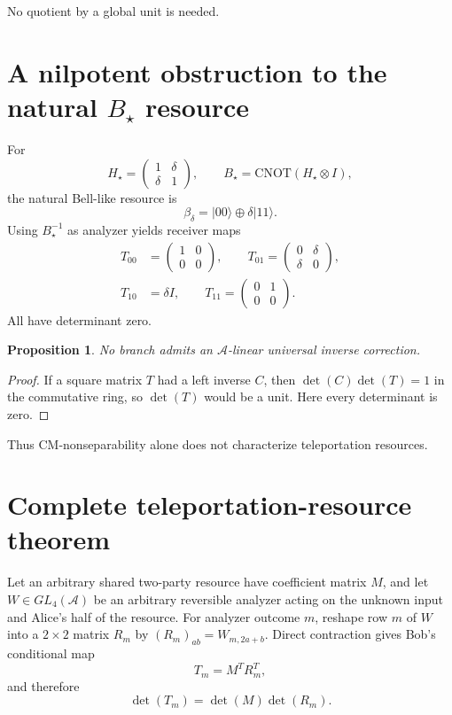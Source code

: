 \documentclass[11pt]{article}
\newtheorem{proposition}{Proposition}
\newcommand{\A}{\mathcal A}
\newcommand{\xorp}{\mathbin{\oplus}}
\newcommand{\ket}[1]{\lvert #1\rangle}
\begin{document}
No quotient by a global unit is needed.

\section{A nilpotent obstruction to the natural $B_\star$ resource}

For
\[
H_\star=\begin{pmatrix}1&\delta\\\delta&1\end{pmatrix},\qquad
B_\star=\mathrm{CNOT}(H_\star\otimes I),
\]
the natural Bell-like resource is
\[
\beta_\delta=\ket{00}\xorp\delta\ket{11}.
\]
Using $B_\star^{-1}$ as analyzer yields receiver maps
\[
\begin{split}
T_{00}&=\begin{pmatrix}1&0\\0&0\end{pmatrix},\qquad
T_{01}=\begin{pmatrix}0&\delta\\\delta&0\end{pmatrix},\\
T_{10}&=\delta I,\qquad
T_{11}=\begin{pmatrix}0&1\\0&0\end{pmatrix}.
\end{split}
\]
All have determinant zero.

\begin{proposition}
No branch admits an $\A$-linear universal inverse correction.
\end{proposition}

\begin{proof}
If a square matrix $T$ had a left inverse $C$, then
$\det(C)\det(T)=1$ in the commutative ring, so $\det(T)$ would be a unit.
Here every determinant is zero.
\end{proof}

Thus CM-nonseparability alone does not characterize teleportation resources.

\section{Complete teleportation-resource theorem}

Let an arbitrary shared two-party resource have coefficient matrix $M$, and
let $W\in GL_4(\A)$ be an arbitrary reversible analyzer acting on the unknown
input and Alice's half of the resource.  For analyzer outcome $m$, reshape row
$m$ of $W$ into a $2\times2$ matrix $R_m$ by
$(R_m)_{ab}=W_{m,2a+b}$.  Direct contraction gives Bob's conditional map
\[
T_m=M^T R_m^T,
\]
and therefore
\[
\det(T_m)=\det(M)\det(R_m).
\]
\end{document}

